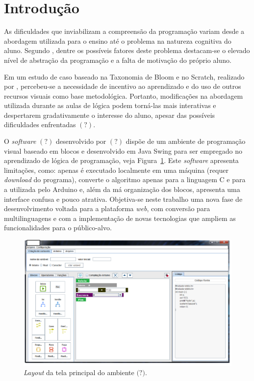 \documentclass[12pt]{article}
\begin{document}
\section{Introdução} 
As dificuldades que inviabilizam a compreensão da programação variam desde a abordagem utilizada para o ensino até o problema na natureza cognitiva do aluno. Segundo \cite{GOMES:2008}, dentre os possíveis fatores deste problema destacam-se o elevado nível de abstração da programação e a falta de motivação do próprio aluno. 
\par Em um estudo de caso baseado na Taxonomia de Bloom e no Scratch, realizado por \cite{ARAUJO:2013}, percebeu-se a necessidade de incentivo ao aprendizado e do uso de outros recursos visuais como base metodológica. Portanto, modificações na abordagem utilizada durante as aulas de lógica podem torná-las mais interativas e despertarem gradativamente o interesse do aluno, apesar das possíveis dificuldades enfrentadas $(?)$.
\par O \textit{software} $(?)$ desenvolvido por $(?)$ dispõe de um ambiente de programação visual baseado em blocos e desenvolvido em Java Swing para ser empregado no aprendizado de lógica de programação, veja Figura~\ref{fig1}. Este \textit{software} apresenta limitações, como: apenas é executado localmente em uma máquina (requer \textit{download} do programa), converte o algoritmo apenas para a linguagem C e para a utilizada pelo Arduino e, além da má organização dos blocos, apresenta uma interface confusa e pouco atrativa. Objetiva-se neste trabalho uma nova fase de desenvolvimento voltada para a plataforma \textit{web}, com conversão para multilinguagens e com a implementação de novas tecnologias que ampliem as funcionalidades para o público-alvo.
	\begin{figure}[h]
		\centering
		\includegraphics[scale=0.4]{2017.png}
		\caption{\textit{Layout} da tela principal do ambiente $\textbf{(?)}$.}
		\label{fig1}
	\end{figure}
	
\end{document}
